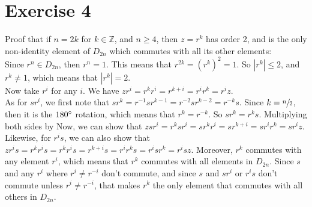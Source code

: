 \documentclass[12pt]{article}
\newcommand{\Z}{\mathbb{Z}}
\begin{document}
    \section*{Exercise 4}
    Proof that if $n = 2k$ for $k \in \Z$,
    and $n \geqslant 4$,
    then $z = r^k$ has order 2,
    and is the only non-identity element of $D_{2n}$
    which commutes with all its other elements: \\
    Since $r^n \in D_{2n}$,
    then $r^n = 1$.
    This means that $r^{2k} = (r^k)^2 = 1$.
    So $|r^k| \leqslant 2$,
    and $r^k \neq 1$,
    which means that $|r^k| = 2$. \\
    Now take $r^i$ for any $i$.
    We have $zr^i = r^kr^i = r^{k+i} = r^ir^k = r^iz$. \\
    As for $sr^i$,
    we first note that $sr^k = r^{-1}sr^{k-1} 
    = r^{-2}sr^{k-2}
    = r^{-k}s$.
    Since $k = \sfrac{n}{2}$,
    then it is the $180 \degree$ rotation, which means that $r^k = r^{-k}$.
    So $sr^k = r^ks$.
    Multiplying both sides by 
    Now, we can show that $zsr^i = r^ksr^i
    = sr^kr^i
    = sr^{k + i}
    = sr^ir^k
    = sr^iz$.
    Likewise, for $r^is$,
    we can also show that $zr^is = r^kr^is
    = r^kr^is
    = r^{k + i}s
    = r^ir^ks
    = r^isr^k
    = r^isz$.
    Moreover, $r^k$ commutes with any element $r^i$,
    which means that $r^k$ commutes with all elements in $D_{2n}$.
    Since $s$ and any $r^i$ where $r^i \neq r^{-i}$ don't commute,
    and since $s$ and $sr^i$ or $r^is$ don't commute unless $r^i \neq r^{-i}$,
    that makes $r^k$ the only element that commutes with all others
    in $D_{2n}$.
\end{document}

